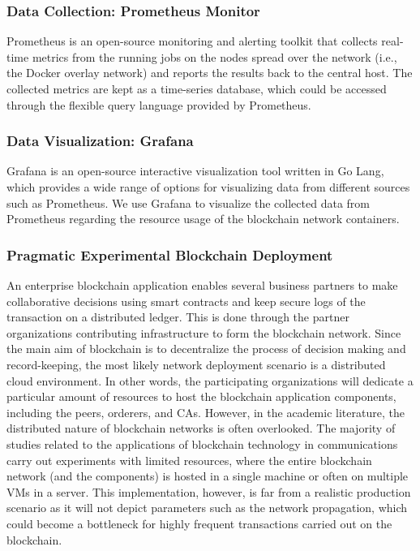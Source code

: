 \subsubsection{Data Collection: Prometheus Monitor}

Prometheus \cite{prometheus} is an open-source monitoring and alerting toolkit that collects real-time metrics from the running jobs on the nodes spread over the network (i.e., the Docker overlay network) and reports the results back to the central host. The collected metrics are kept as a time-series database, which could be accessed through the flexible query language provided by Prometheus.

\subsubsection{Data Visualization: Grafana}
Grafana \cite{grafana} is an open-source interactive visualization tool written in Go Lang, which provides a wide range of options for visualizing data from different sources such as Prometheus. We use Grafana to visualize the collected data from Prometheus regarding the resource usage of the blockchain network containers.



\subsubsection{Pragmatic Experimental Blockchain Deployment}
An enterprise blockchain application enables several business partners to make collaborative decisions using smart contracts and keep secure logs of the transaction on a distributed ledger. This is done through the partner organizations contributing infrastructure to form the blockchain network. Since the main aim of blockchain is to decentralize the process of decision making and record-keeping, the most likely network deployment scenario is a distributed cloud environment. In other words, the participating organizations will dedicate a particular amount of resources to host the blockchain application components, including the peers, orderers, and \acp{CA}. However, in the academic literature, the distributed nature of blockchain networks is often overlooked. The majority of studies related to the applications of blockchain technology in communications carry out experiments with limited resources, where the entire blockchain network (and the components) is hosted in a single machine or often on multiple \acp{VM} in a server. This implementation, however, is far from a realistic production scenario as it will not depict parameters such as the network propagation, which could become a bottleneck for highly frequent transactions carried out on the blockchain.

